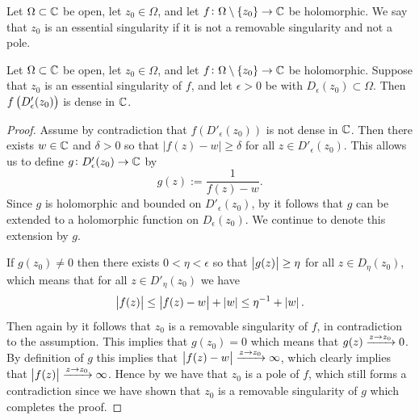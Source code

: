 \documentclass[11pt,a4paper]{article}
\begin{document}
\begin{definition}
  Let $\Omega \subset \mathbb{C}$ be open,
  let $z_0 \in \Omega$,
  and let $f \colon \Omega \setminus \left\{z_0\right\} \to \mathbb{C}$ be holomorphic.
  We say that $z_0$ is an essential singularity if it is not a removable
  singularity and not a pole.
\end{definition}


\begin{theorem}
  Let $\Omega \subset \mathbb{C}$ be open,
  let $z_0 \in \Omega$,
  and let $f \colon \Omega \setminus \left\{z_0\right\} \to \mathbb{C}$ be holomorphic.
  Suppose that $z_0$ is an essential singularity of $f$,
  and let $\epsilon > 0$ be with $D_{\epsilon}(z_0) \subset \Omega$.
  Then $f\del{D'_{\epsilon}(z_0)}$ is dense in $\mathbb{C}$.
\end{theorem}
\begin{proof}
  Assume by contradiction that $f(D'_{\epsilon}(z_0))$ is not dense in $\mathbb{C}$.
  Then there exists $w \in \mathbb{C}$ and $\delta > 0$ so that
  $|f(z) - w| \geq \delta$ for all $z \in D'_{\epsilon}(z_0)$.
  This allows us to define $g \colon D'_{\epsilon}(z_0) \to \mathbb{C}$ by
  \[
    g(z) := \frac{1}{f(z) - w}.
  \]
  Since $g$ is holomorphic and bounded on $D'_{\epsilon}(z_0)$,
  by  it follows that $g$ can
  be extended to a holomorphic function on $D_{\epsilon}(z_0)$.
  We continue to denote this extension by $g$.

  If $g(z_0) \neq 0$ then there exists $0 < \eta < \epsilon$ so that
  $\left\lvert g(z)\right\rvert \geq \eta$ for all $z \in D_{\eta}(z_0)$,
  which means that for all $z \in D'_{\eta}(z_0)$ we have
  \[
    \left\lvert f(z)\right\rvert \le \left\lvert f(z) - w\right\rvert + \left\lvert w\right\rvert \le \eta^{-1} + \left\lvert w\right\rvert.
  \]
  Then again by  it follows that
  $z_0$ is a removable singularity of $f$, in contradiction to the assumption.
  This implies that $g(z_0) = 0$ which means that $g(z) \xrightarrow{z \to z_0} 0$.
  By definition of $g$ this implies that
  $\left\lvert f(z) - w\right\rvert \xrightarrow{z \to z_0} \infty$,
  which clearly implies that $\left\lvert f(z)\right\rvert \xrightarrow{z \to z_0} \infty$.
  Hence by  we have that $z_0$ is a pole of $f$,
  which still forms a contradiction since we have shown that $z_0$ 
  is a removable singularity of $g$ which completes the proof.
\end{proof}
\end{document}
